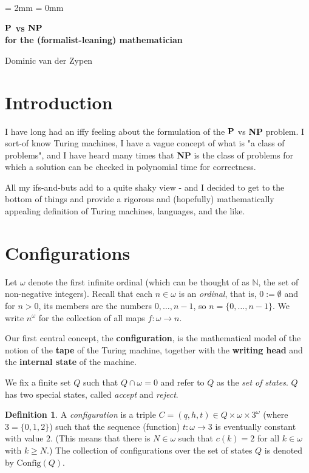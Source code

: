 \documentclass[12pt, a4paper]{amsart}
\theoremstyle{definition}
\newtheorem{definition}[lemma]{Definition}
\newcommand{\C}{\text{Config}}
\begin{document}
\parskip = 2mm
\parindent = 0mm

\begin{center}
    \textbf{\Large ${\bf P}$ vs ${\bf NP}$ \\ for the (formalist-leaning) mathematician}
\end{center}

\vspace*{3mm}

\begin{center}
Dominic van der Zypen
\end{center}

\section{Introduction}
I have long had an iffy feeling about the formulation of the ${\bf P}$ vs {\bf NP} problem. 
I sort-of know Turing machines, I have a vague concept of what is "a class of problems", 
and I have heard many times that {\bf NP} is the class of problems for which a solution 
can be checked in polynomial time for correctness.

All my ifs-and-buts add to a quite shaky view - and I decided to get to the bottom of 
things and provide a rigorous and (hopefully) mathematically appealing definition of 
Turing machines, languages, and the like. 

\section{Configurations}

Let $ \omega$ denote the first infinite ordinal (which can be thought 
of as $ \mathbb{N}$, the set of non-negative integers). Recall that each
$n \in \omega$ is an {\em ordinal}, that is, $0:=\emptyset$ and for $n>0$,
its members are the numbers $ 0,\ldots, n-1$, so $ n = \{0,\ldots,n-1\}$. 
We write $n^\omega$ for the collection of all maps $f:\omega \to n$. 

Our first 
central concept, the {\bf configuration}, is the mathematical model of the 
notion of the {\bf tape} of the Turing machine, together with the {\bf writing 
head} and the {\bf internal state} of the machine. 

We fix a finite set $Q$ such that $Q \cap \omega = 0$ and refer to $Q$ as the
{\em set of states}. $Q$ has two special states, called {\em accept} and 
{\em reject}. 

\begin{definition} A {\em configuration} is a triple $C = (q, h, t) \in
    Q \times \omega \times 3^\omega$  (where $3 = \{0,1,2\}$) such that the
    sequence (function) $t:\omega\to 3$ is eventually constant with value $2$. (This means
    that there is $N\in \omega$ such that $c(k) = 2$ for all $k\in \omega$ 
    with $k\geq N$.) The collection of configurations over the set of states $Q$ 
    is denoted by $\C(Q)$.
\end{definition}
\end{document}
